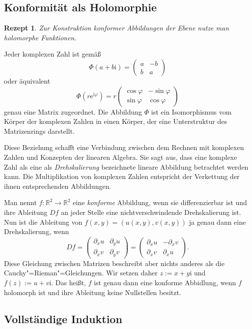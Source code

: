 \documentclass[a4paper,10pt,fleqn,twocolumn,twoside,dvipdfmx]{scrartcl}
\theoremstyle{rmbox}
\newtheorem{Rezept}{Rezept}[section]
\newcommand{\ee}{\mathrm{e}}
\newcommand{\ui}{\mathrm{i}}
\newcommand{\R}{\mathbb R}
\begin{document}
\newpage
\subsection{Konformität als Holomorphie}

\begin{Rezept}
Zur Konstruktion konformer Abbildungen der Ebene
nutze man holomorphe Funktionen.
\end{Rezept}

\noindent
Jeder komplexen Zahl ist gemäß
\[\Phi(a+b\ui) = \begin{pmatrix}a & -b\\ b & a\end{pmatrix}\]
oder äquivalent
\[\Phi(r\ee^{\ui\varphi}) = r\begin{pmatrix}
\cos\varphi & -\sin\varphi\\
\sin\varphi & \cos\varphi
\end{pmatrix}\]
genau eine Matrix zugeordnet. Die Abbildung $\Phi$ ist ein
Isomorphismus vom Körper der komplexen Zahlen in einen Körper,
der eine Unterstruktur des Matrizenrings darstellt.

Diese Beziehung schafft eine Verbindung zwischen dem
Rechnen mit komplexen Zahlen und Konzepten der linearen Algebra.
Sie sagt aus, dass eine komplexe Zahl als eine als \emph{Drehskalierung}
bezeichnete lineare Abbildung betrachtet werden kann. Die Multiplikation
von komplexen Zahlen entspricht der Verkettung der ihnen entsprechenden
Abbildungen.

Man nennt $f\colon\R^2\to\R^2$ eine \emph{konforme} Abbildung, wenn sie
differenzierbar ist und ihre Ableitung $Df$ an jeder Stelle
eine nichtverschwindende Drehskalierung ist. Nun ist die
Ableitung von $f(x,y)=(u(x,y),v(x,y))$ ja genau dann eine
Drehskalierung, wenn
\[Df = \begin{pmatrix}
\partial_x u & \partial_y u\\
\partial_x v & \partial_y v
\end{pmatrix} = \begin{pmatrix}
\partial_x u & -\partial_x v\\
\partial_x v & \partial_x u
\end{pmatrix}.\]
Diese Gleichung zwischen Matrizen beschreibt aber nichts anderes als
die Cauchy"=Rieman"=Gleichungen. Wir setzen daher $z:=x+y\ui$ und
$f(z):=u+v\ui$. Das heißt, $f$ ist genau dann eine konforme
Abbidlung, wenn $f$ holomorph ist und ihre Ableitung keine
Nullstellen besitzt.

\subsection{Vollständige Induktion}
\end{document}
